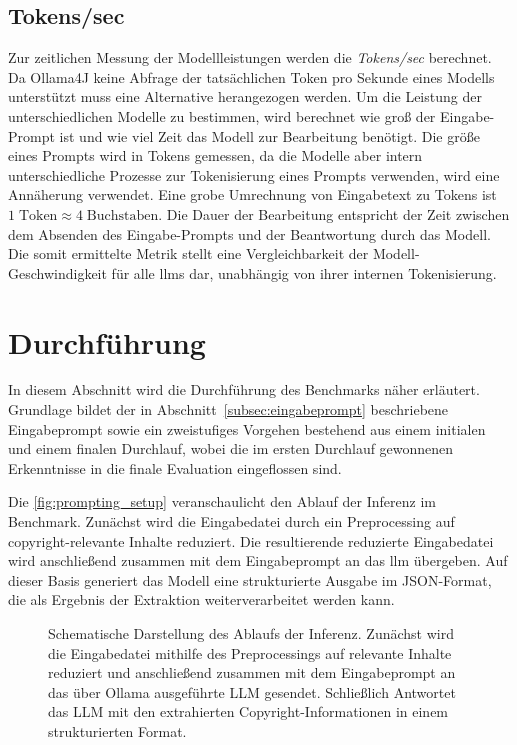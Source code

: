 \subsection{Tokens/sec}
Zur zeitlichen Messung der Modellleistungen werden die \textit{Tokens/sec} berechnet.
Da Ollama4J keine Abfrage der tatsächlichen Token pro Sekunde eines Modells unterstützt muss eine Alternative herangezogen werden.
Um die Leistung der unterschiedlichen Modelle zu bestimmen, wird berechnet wie groß der Eingabe-Prompt ist und wie viel Zeit das Modell zur Bearbeitung benötigt.
Die größe eines Prompts wird in Tokens gemessen, da die Modelle aber intern unterschiedliche Prozesse zur Tokenisierung eines Prompts verwenden, wird eine Annäherung verwendet.
Eine grobe Umrechnung von Eingabetext zu Tokens ist $1\;\text{Token}\approx 4\;\text{Buchstaben}$\autocite{noauthor_what_nodate}.
Die Dauer der Bearbeitung entspricht der Zeit zwischen dem Absenden des Eingabe-Prompts und der Beantwortung durch das Modell.
Die somit ermittelte Metrik stellt eine Vergleichbarkeit der Modell-Geschwindigkeit für alle \glspl{llm} dar, unabhängig von ihrer internen Tokenisierung.


\section{Durchführung}\label{sec:durchfuhrung-benchmark}

In diesem Abschnitt wird die Durchführung des Benchmarks näher erläutert.
Grundlage bildet der in Abschnitt~\ref{subsec:eingabeprompt} beschriebene Eingabeprompt sowie ein zweistufiges Vorgehen bestehend aus einem initialen und einem finalen Durchlauf, wobei die im ersten Durchlauf gewonnenen Erkenntnisse in die finale Evaluation eingeflossen sind.

Die \autoref{fig:prompting_setup} veranschaulicht den Ablauf der Inferenz im Benchmark.
Zunächst wird die Eingabedatei durch ein Preprocessing auf copyright-relevante Inhalte reduziert.
Die resultierende reduzierte Eingabedatei wird anschließend zusammen mit dem Eingabeprompt an das \gls{llm} übergeben.
Auf dieser Basis generiert das Modell eine strukturierte Ausgabe im JSON-Format, die als Ergebnis der Extraktion weiterverarbeitet werden kann.

\begin{figure}[ht]
    \centering
    \caption{Schematische Darstellung des Ablaufs der Inferenz. Zunächst wird die Eingabedatei mithilfe des Preprocessings auf relevante Inhalte reduziert und anschließend zusammen mit dem Eingabeprompt an das über Ollama ausgeführte LLM gesendet. Schließlich Antwortet das LLM mit den extrahierten Copyright-Informationen in einem strukturierten Format.}
    \label{fig:prompting_setup}
\end{figure}

